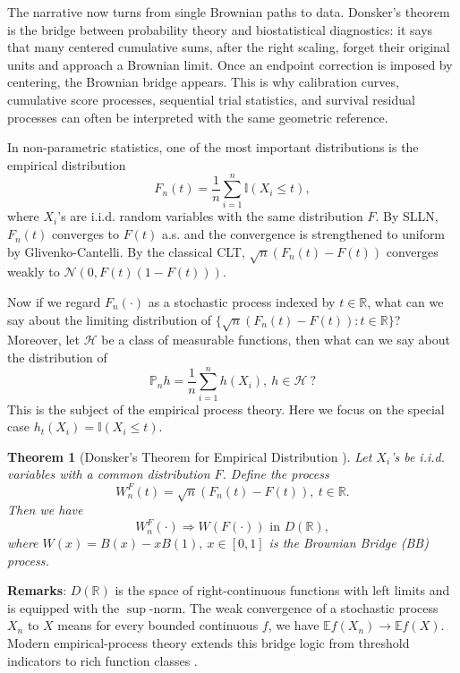 \documentclass{article}
\theoremstyle{plain}
\newtheorem{theorem}{Theorem}
\theoremstyle{definition}
\begin{document}
The narrative now turns from single Brownian paths to data. Donsker's
theorem is the bridge between probability theory and biostatistical
diagnostics: it says that many centered cumulative sums, after the right
scaling, forget their original units and approach a Brownian limit. Once an
endpoint correction is imposed by centering, the Brownian bridge appears.
This is why calibration curves, cumulative score processes, sequential
trial statistics, and survival residual processes can often be interpreted
with the same geometric reference.

In non-parametric statistics, one of the most important distributions is the empirical distribution
\[
F_n(t) = \frac{1}{n}\sum_{i=1}^n\mathbb{I}(X_i\le t),
\]
where $X_i$'s are i.i.d. random variables with the same distribution $F$. By SLLN, $F_n(t)$ converges to $F(t)$ a.s. and the convergence is strengthened to uniform by Glivenko-Cantelli. By the classical CLT, $\sqrt{n}\left(F_n(t)-F(t)\right)$ converges weakly to $\mathcal{N}(0,F(t)(1-F(t)))$. 

Now if we regard $F_n(\cdot)$ as a stochastic process indexed by $t\in\mathbb{R}$, what can we say about the limiting distribution of 
$\{\sqrt{n}(F_n(t)-F(t)) : t\in\mathbb{R}\}$? Moreover, let $\mathcal{H}$ be a class of measurable functions, then what can we say about the distribution of
\[
\mathbb{P}_n h = \frac{1}{n}\sum_{i=1}^n h(X_i),\ h\in\mathcal{H}\ ?
\]
This is the subject of the empirical process theory. Here we focus on the special case $h_t(X_i) = \mathbb{I}(X_i\le t)$.

\begin{theorem}[Donsker's Theorem for Empirical Distribution \citep{donsker1952justification,billingsley2013convergence}]
Let $X_i$'s be i.i.d. variables with a common distribution $F$. Define the process 
\[
W_{n}^F(t) = \sqrt{n}\left( F_n(t) - F(t) \right),\ t\in\mathbb{R}.
\]
Then we have
\[
W_n^F(\cdot) \Rightarrow W(F(\cdot))\text{ in }D(\mathbb{R}),
\]
where $W(x) = B(x) - xB(1),\ x\in[0,1]$ is the Brownian Bridge (BB) process.
\end{theorem}

\textbf{Remarks}: $D(\mathbb{R})$ is the space of right-continuous functions with left limits and is equipped with the $\sup$-norm. The weak convergence of a stochastic process $X_n$ to $X$ means for every bounded continuous $f$, we have $\mathbb{E}f(X_n)\rightarrow\mathbb{E}f(X)$. Modern empirical-process theory extends this bridge logic from threshold indicators to rich function classes \citep{vandervaart1996weak,kosorok2008introduction}. 
\end{document}

